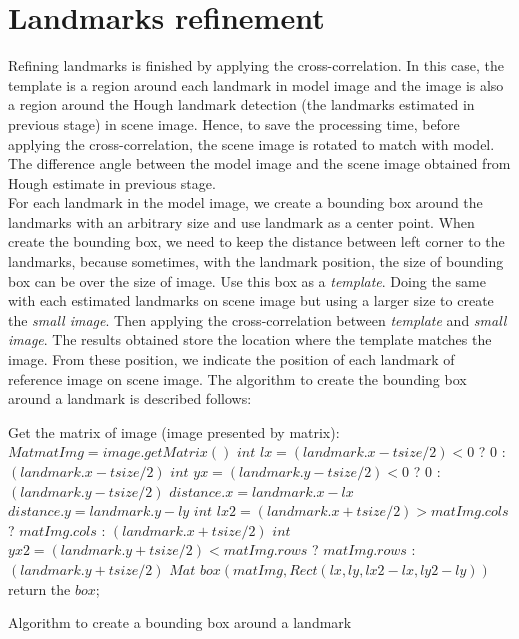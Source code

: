 \section{Landmarks refinement}
Refining landmarks is finished by applying the cross-correlation. In this case, the template is a region around each landmark in model image and the image is also a region around the Hough landmark detection (the landmarks estimated in previous stage) in scene image. Hence, to save the processing time, before applying the cross-correlation, the scene image is rotated to match with model. The difference angle between the model image and the scene image obtained from Hough estimate in previous stage.\\[0.2cm]
For each landmark in the model image, we create a bounding box around the landmarks with an arbitrary size and use landmark as a center point. When create the bounding box, we need to keep the distance between left corner to the landmarks, because sometimes, with the landmark position, the size of bounding box can be over the size of image. Use this box as a \textit{template}. Doing the same with each estimated landmarks on scene image but using a larger size to create the \textit{small image}. Then applying the cross-correlation between \textit{template} and \textit{small image}. The results obtained store the location where the template matches the image. From these position, we indicate the position of each landmark of reference image on scene image. The algorithm to create the bounding box around a landmark is described follows:\\[0.2cm]
\begin{algorithm}[H]
\Indm 
{}
\SetAlgoLined
{}
\Indp
Get the matrix of image (image presented by matrix): $Mat matImg = image.getMatrix()$\;
$int$ $lx = (landmark.x - tsize/2) < 0$ ? $0$ : $(landmark.x - tsize/2)$\;
$int$ $yx = (landmark.y - tsize/2) < 0$ ? $0$ : $(landmark.y - tsize/2)$\;
$distance.x = landmark.x - lx$\;
$distance.y = landmark.y - ly$\;
$int$ $lx2 = (landmark.x + tsize/2) > matImg.cols$ ? $matImg.cols$ : $(landmark.x + tsize/2)$\;
$int$ $yx2 = (landmark.y + tsize/2) < matImg.rows$ ? $matImg.rows$ : $(landmark.y + tsize/2)$\;
$Mat$ $box(matImg,Rect(lx,ly,lx2 - lx, ly2 - ly))$\;
return the $box$;
\caption{Algorithm to create a bounding box around a landmark}
\end{algorithm}~\\[0.2cm]
